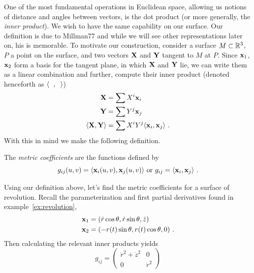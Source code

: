 \begin{unno_rem}
  One of the most fundamental operations in Euclidean space, allowing us notions of distance and angles between vectors, is the dot product (or more generally, the \emph{inner product}). We wish to have the same capability on our surface. Our definition is due to Millman77 and while we will see other representations later on, his is memorable. To motivate our construction, consider a surface $M \subset \mathbb{R}^3$, $P$ a point on the surface, and two vectors $\mathbf{X}$ and $\mathbf{Y}$ tangent to $M$ at $P$. Since $\mathbf{x}_1$, $\mathbf{x}_2$ form a basis for the tangent plane, in which $\mathbf{X}$ and $\mathbf{Y}$ lie, we can write them as a linear combination and further, compute their inner product (denoted henceforth as $\langle\phantom{x},\phantom{x}\rangle$)
  \begin{align*}
    \mathbf{X} &= \sum X^i\mathbf{x}_i\\
    \mathbf{Y} &= \sum Y^j\mathbf{x}_j\\
    \langle\mathbf{X}, \mathbf{Y}\rangle &= \sum X^iY^j\langle\mathbf{x}_i, \mathbf{x}_j\rangle \ .
  \end{align*}
  With this in mind we make the following definition.
\end{unno_rem}

\begin{defn}
  The \emph{metric coefficients} are the functions defined by
  \[
    g_{ij}(u, v) = \langle\mathbf{x}_i(u, v), \mathbf{x}_j(u, v)\rangle \text{ or } g_{ij} = \langle\mathbf{x}_i, \mathbf{x}_j\rangle \ .
  \]
\end{defn}


\begin{ex}
  Using our definition above, let's find the metric coefficients for a surface of revolution. Recall the parameterization and first partial derivatives found in example~\ref{ex:revolution},
  \begin{align*}
    \mathbf{x}_1 &= (\dot{r}\cos{\theta}, \dot{r}\sin{\theta}, \dot{z})\\
    \mathbf{x}_2 &= (-r(t)\sin{\theta}, r(t)\cos{\theta}, 0) \ .
  \end{align*}
  Then calculating the relevant inner products yields
  \[
    g_{ij} = \left(\begin{array}{cc}
      \dot{r}^2 + \dot{z}^2 & 0\\
      0 & \dot{r}^2
    \end{array}\right)
  \]
\end{ex}

